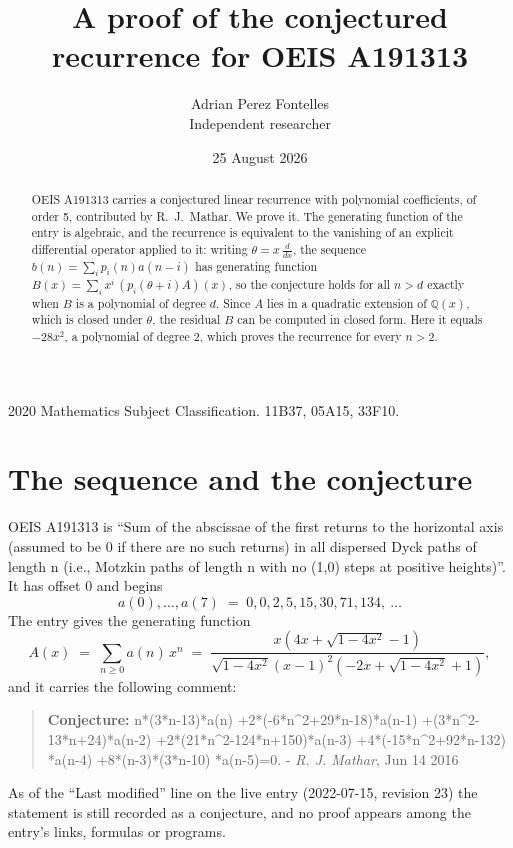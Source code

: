 \documentclass[11pt,a4paper]{article}
\title{A proof of the conjectured recurrence for OEIS A191313}
\author{Adrian Perez Fontelles\\ \small Independent researcher}
\date{25 August 2026}
\theoremstyle{plain}
\theoremstyle{definition}
\begin{document}
\maketitle

\begin{abstract}
OEIS A191313 carries a conjectured linear recurrence with polynomial coefficients, of
order 5, contributed by R.~J.~Mathar. We prove it. The generating function of the
entry is algebraic, and the recurrence is equivalent to the vanishing of an explicit
differential operator applied to it: writing $\theta=x\,\frac{d}{dx}$, the sequence
$b(n)=\sum_{i}p_{i}(n)a(n-i)$ has generating function
$B(x)=\sum_{i}x^{i}\,(p_{i}(\theta+i)A)(x)$, so the conjecture holds for all $n>d$ exactly
when $B$ is a polynomial of degree $d$. Since $A$ lies in a quadratic extension of
$\mathbb{Q}(x)$, which is closed under $\theta$, the residual $B$ can be computed in
closed form. Here it equals $- 28 x^{2}$, a polynomial of degree $2$, which proves
the recurrence for every $n>2$.
\end{abstract}

\noindent\small 2020 Mathematics Subject Classification. 11B37, 05A15, 33F10.\normalsize

\section{The sequence and the conjecture}

OEIS A191313 is ``Sum of the abscissae of the first returns to the horizontal axis (assumed to be 0 if there are no such returns) in all dispersed Dyck paths of length n (i.e., Motzkin paths of length n with no (1,0) steps at positive heights)''. It has offset $0$ and begins
\[
a(0),\dots,a(7)\;=\;0, 0, 2, 5, 15, 30, 71, 134,\ \dots
\]
The entry gives the generating function
\begin{equation}\label{eq:gf}
A(x)\;=\;\sum_{n\ge 0} a(n)\,x^{n}\;=\;\frac{x \left(4 x + \sqrt{1 - 4 x^{2}} - 1\right)}{\sqrt{1 - 4 x^{2}} \left(x - 1\right)^{2} \left(- 2 x + \sqrt{1 - 4 x^{2}} + 1\right)} ,
\end{equation}
and it carries the following comment:
\begin{quote}\small
\textbf{Conjecture:} n*(3*n-13)*a(n) +2*(-6*n\^{}2+29*n-18)*a(n-1) +(3*n\^{}2-13*n+24)*a(n-2) +2*(21*n\^{}2-124*n+150)*a(n-3) +4*(-15*n\^{}2+92*n-132) *a(n-4) +8*(n-3)*(3*n-10) *a(n-5)=0. - \emph{R. J. Mathar}, Jun 14 2016
\end{quote}
As of the ``Last modified'' line on the live entry (2022-07-15, revision 23) the
statement is still recorded as a conjecture, and no proof appears among the entry's links,
formulas or programs.
\end{document}

